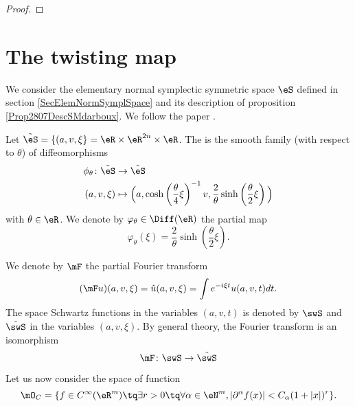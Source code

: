\begin{proof}
\end{proof}


\section{The twisting map}

We consider the elementary normal symplectic symmetric space $\eS$ defined in section \ref{SecElemNormSymplSpace} and its description of proposition \ref{Prop2807DescSMdarboux}. We follow the paper \cite{QuantifKhalerian}.

Let $\tilde\eS=\{ (a,v,\xi \}=\eR\times\eR^{2n}\times\eR$. The  is the smooth family (with respect to $\theta$) of diffeomorphisms
\begin{equation}
	\begin{aligned}
		\phi_{\theta}\colon \tilde\eS&\to \tilde\eS \\
		(a,v,\xi)&\mapsto \Big( a,\cosh\left( \frac{ \theta }{ 4 }\xi \right)^{-1}v,\frac{ 2 }{ \theta }\sinh\left( \frac{ \theta }{ 2 }\xi \right) \Big) 
	\end{aligned}
\end{equation}
with $\theta\in\eR$. We denote by $\varphi_{\theta}\in\Diff(\eR)$ the partial map
\begin{equation}
	\varphi_{\theta}(\xi)=\frac{ 2 }{ \theta }\sinh(\frac{ \theta }{ 2 }\xi).
\end{equation}

We denote by $\mF$ the partial Fourier transform
\begin{equation}
	(\mF u)(a,v,\xi)=\hat u(a,v,\xi)=\int e^{-i\xi t}u(a,v,t)dt.
\end{equation}
The space Schwartz functions in the variables $(a,v,t)$ is denoted by $\swS$ and $\tilde\swS$ in the variables $(a,v,\xi)$. By general theory, the Fourier transform is an isomorphism
\begin{equation}
	\mF\colon \swS\to \tilde\swS
\end{equation}

Let us now consider the space of function
\begin{equation}
	\mO_C=\{ f\in C^{\infty}(\eR^m)\tq \exists r>0\tq\forall\alpha\in\eN^m,| \partial^{\alpha}f(x) |<C_{\alpha}(1+| x |)^r \}.
\end{equation}

